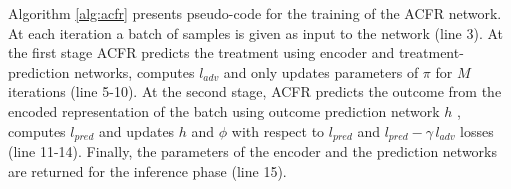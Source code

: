 \documentclass[letterpaper]{article} %
\begin{document}
Algorithm \ref{alg:acfr} presents pseudo-code for the training of the ACFR network.  At each iteration a batch of samples is given as input to the network (line 3). At the first stage ACFR predicts the treatment using encoder and treatment-prediction networks,
computes $l_{adv}$  and only updates parameters of $\pi$ for $M$
iterations (line 5-10). At the second stage, ACFR predicts
the outcome from the encoded representation of the batch using
outcome prediction network $h$ , computes $l_{pred}$  and updates $h$ and $\phi$
with respect to $l_{pred}$ and $l_{pred} - \gamma \,  l_{adv}$  losses (line 11-14).
Finally, the parameters of the encoder and the prediction networks are returned for the inference phase (line 15).
    
\end{document}
